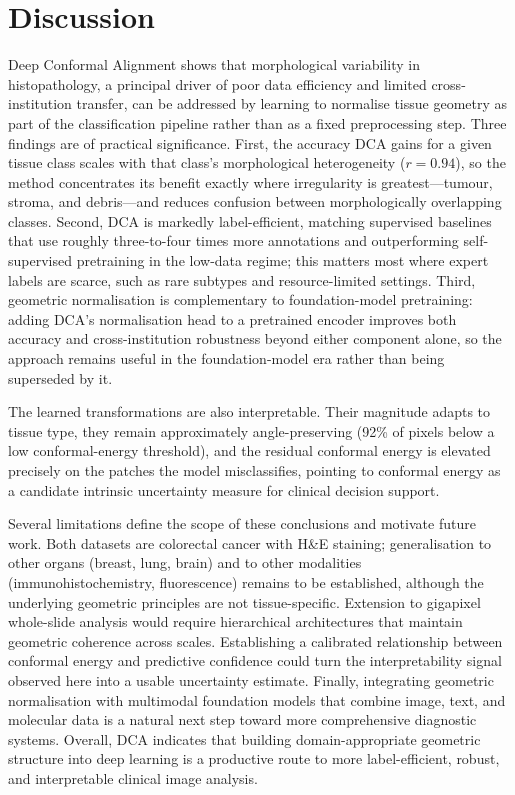 \documentclass[pdflatex,sn-nature]{sn-jnl}%
\theoremstyle{thmstyleone}%
\theoremstyle{thmstyletwo}%
\theoremstyle{thmstylethree}%
\begin{document}

\section{Discussion}
\label{sec:discussion}

Deep Conformal Alignment shows that morphological variability in histopathology,
a principal driver of poor data efficiency and limited cross-institution
transfer, can be addressed by learning to normalise tissue geometry as part of
the classification pipeline rather than as a fixed preprocessing step. Three
findings are of practical significance. First, the accuracy DCA gains for a given
tissue class scales with that class's morphological heterogeneity
($r=0.94$), so the method concentrates its benefit exactly where irregularity is
greatest---tumour, stroma, and debris---and reduces confusion between
morphologically overlapping classes. Second, DCA is markedly label-efficient,
matching supervised baselines that use roughly three-to-four times more
annotations and outperforming self-supervised pretraining in the low-data regime;
this matters most where expert labels are scarce, such as rare subtypes and
resource-limited settings. Third, geometric normalisation is complementary to
foundation-model pretraining: adding DCA's normalisation head to a pretrained
encoder improves both accuracy and cross-institution robustness beyond either
component alone, so the approach remains useful in the foundation-model era rather
than being superseded by it.

The learned transformations are also interpretable. Their magnitude adapts to
tissue type, they remain approximately angle-preserving (92\% of pixels below a
low conformal-energy threshold), and the residual conformal energy is elevated
precisely on the patches the model misclassifies, pointing to conformal energy as
a candidate intrinsic uncertainty measure for clinical decision support.

Several limitations define the scope of these conclusions and motivate future
work. Both datasets are colorectal cancer with H\&E staining; generalisation to
other organs (breast, lung, brain) and to other modalities (immunohistochemistry,
fluorescence) remains to be established, although the underlying geometric
principles are not tissue-specific. Extension to gigapixel whole-slide analysis
would require hierarchical architectures that maintain geometric coherence across
scales. Establishing a calibrated relationship between conformal energy and
predictive confidence could turn the interpretability signal observed here into a
usable uncertainty estimate. Finally, integrating geometric normalisation with
multimodal foundation models that combine image, text, and molecular data is a
natural next step toward more comprehensive diagnostic systems. Overall, DCA
indicates that building domain-appropriate geometric structure into deep learning
is a productive route to more label-efficient, robust, and interpretable clinical
image analysis.
\end{document}
